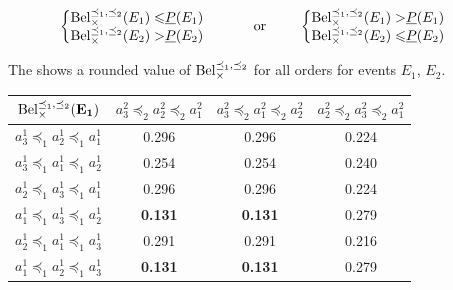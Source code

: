 \begin{example}
 \begin{align*}
    \begin{cases}
        \begin{split}
            \mathrm{Bel}_\times^{\preceq_1,\preceq_2}(E_1) \leqslant& \underline{P}(E_1)\\
            \mathrm{Bel}_\times^{\preceq_1,\preceq_2}(E_2) >& \underline{P}(E_2)
        \end{split}
    \end{cases}
    \qquad\text{ or }\qquad
    \begin{cases}
        \begin{split}
            \mathrm{Bel}_\times^{\preceq_1,\preceq_2}(E_1) >& \underline{P}(E_1)\\
            \mathrm{Bel}_\times^{\preceq_1,\preceq_2}(E_2) \leqslant& \underline{P}(E_2)
        \end{split}
    \end{cases}
\end{align*}

The  shows a rounded value of $\mathrm{Bel}^{\preceq_1,\preceq_2}_\times$ for all orders for events $E_1$, $E_2$.

\begin{center}
\begin{tabular}{|c||c|c|c|}
\hline
$\mathrm{Bel}^{\preceq_1,\preceq_2}_\times(\mathbf{E_1})$ & $a^2_3\preceq_2a^2_2\preceq_2a^2_1$ & $a^2_3\preceq_2a^2_1\preceq_2a^2_2$ & $a^2_2\preceq_2a^2_3\preceq_2a^2_1$ \\ \hline\hline
$a^1_3\preceq_1a^1_2\preceq_1a^1_1$ & 0.296 & 0.296 & 0.224 \\ \hline
$a^1_3\preceq_1a^1_1\preceq_1a^1_2$ & 0.254 & 0.254 & 0.240 \\ \hline
$a^1_2\preceq_1a^1_3\preceq_1a^1_1$ & 0.296 & 0.296 & 0.224 \\ \hline
$a^1_1\preceq_1a^1_3\preceq_1a^1_2$ & \textbf{0.131} & \textbf{0.131} & 0.279 \\ \hline
$a^1_2\preceq_1a^1_1\preceq_1a^1_3$ & 0.291 & 0.291 & 0.216 \\ \hline
$a^1_1\preceq_1a^1_2\preceq_1a^1_3$ & \textbf{0.131} & \textbf{0.131} & 0.279 \\ \hline
\end{tabular}

\vspace{0.5cm}


\end{center}
\end{example}
